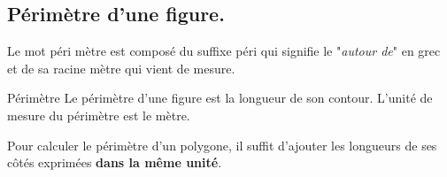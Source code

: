 \begin{pageCours}
\section{Périmètre d'une figure.}

\begin{Ety}
Le mot {\color{orange}péri}{\color{violet} mètre} est composé du suffixe {\color{orange} péri} qui signifie le "\textit{autour de}" en grec et de sa racine {\color{violet} mètre} qui vient de mesure.   
\end{Ety}

\begin{DefT}{Périmètre}
Le périmètre d'une figure est la longueur de son contour. L'unité de mesure du périmètre est le mètre.
\end{DefT}




\begin{Mt}
Pour calculer le périmètre d'un polygone, il suffit d'ajouter les longueurs de ses côtés exprimées \textbf{dans la même unité}.
\end{Mt}

\end{pageCours}
